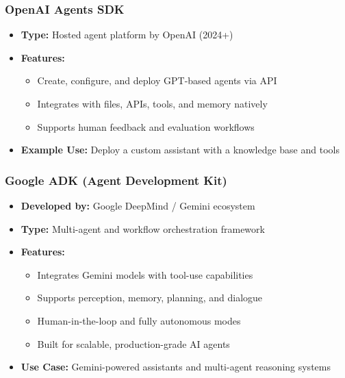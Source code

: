 \begin{frame}[fragile]\frametitle{OpenAI Agents SDK}
    \begin{itemize}
        \item \textbf{Type:} Hosted agent platform by OpenAI (2024+)
        \item \textbf{Features:}
              \begin{itemize}
                  \item Create, configure, and deploy GPT-based agents via API
                  \item Integrates with files, APIs, tools, and memory natively
                  \item Supports human feedback and evaluation workflows
              \end{itemize}
        \item \textbf{Example Use:} Deploy a custom assistant with a knowledge base and tools
    \end{itemize}
\end{frame}

\begin{frame}[fragile]\frametitle{Google ADK (Agent Development Kit)}
    \begin{itemize}
        \item \textbf{Developed by:} Google DeepMind / Gemini ecosystem
        \item \textbf{Type:} Multi-agent and workflow orchestration framework
        \item \textbf{Features:}
              \begin{itemize}
                  \item Integrates Gemini models with tool-use capabilities
                  \item Supports perception, memory, planning, and dialogue
                  \item Human-in-the-loop and fully autonomous modes
                  \item Built for scalable, production-grade AI agents
              \end{itemize}
        \item \textbf{Use Case:} Gemini-powered assistants and multi-agent reasoning systems
    \end{itemize}
\end{frame}

